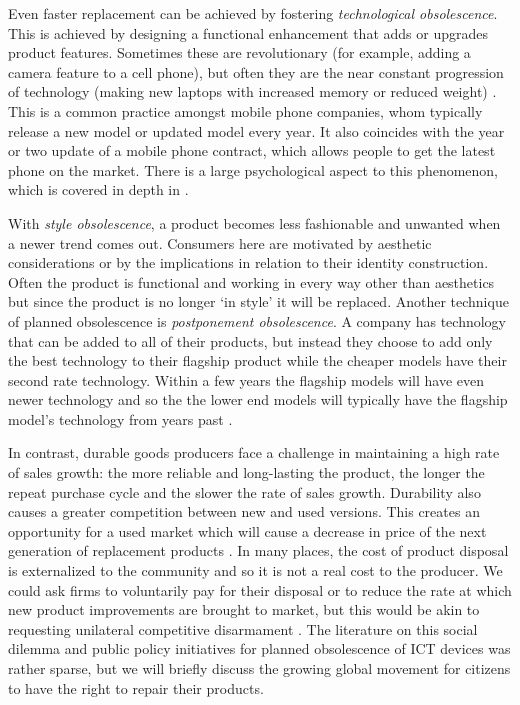 \documentclass{article}
\begin{document}
Even faster replacement can be achieved by fostering \textit{technological obsolescence}. This is achieved by designing a functional enhancement that adds or upgrades product features. Sometimes these are revolutionary (for example, adding a camera feature to a cell phone), but often they are the near constant progression of technology (making new laptops with increased memory or reduced weight) \cite{guiltinan2009creative}. This is a common practice amongst mobile phone companies, whom typically release a new model or updated model every year. It also coincides with the year or two update of a mobile phone contract, which allows people to get the latest phone on the market. There is a large psychological aspect to this phenomenon, which is covered in depth in \cite{keeble2013culture}. 

With \textit{style obsolescence}, a product becomes less fashionable and unwanted when a newer trend comes out. Consumers here are motivated by aesthetic considerations or by the implications in relation to their identity construction. Often the product is functional and working in every way other than aesthetics but since the product is no longer `in style' it will be replaced. Another technique of planned obsolescence is \textit{postponement obsolescence}. A company has technology that can be added to all of their products, but instead they choose to add only the best technology to their flagship product while the cheaper models have their second rate technology. Within a few years the flagship models will have even newer technology and so the the lower end models will typically have the flagship model's technology from years past \cite{keeble2013culture}.

In contrast, durable goods producers face a challenge in maintaining a high rate of sales growth: the more reliable and long-lasting the product, the longer the repeat purchase cycle and the slower the rate of sales growth. Durability also causes a greater competition between new and used versions. This creates an opportunity for a used market which will cause a decrease in price of the next generation of replacement products \cite{guiltinan2009creative}. In many places, the cost of product disposal is externalized to the community and so it is not a real cost to the producer. We could ask firms to voluntarily pay for their disposal or to reduce the rate at which new product improvements are brought to market, but this would be akin to requesting unilateral competitive disarmament \cite{guiltinan2009creative}. The literature on this social dilemma and public policy initiatives for planned obsolescence of ICT devices was rather sparse, but we will briefly discuss the growing global movement for citizens to have the right to repair their products.
\end{document}
